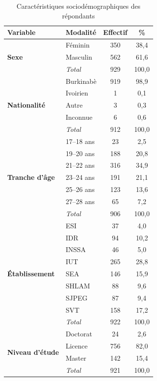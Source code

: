\documentclass[
12pt,          %
a4paper,       %
oneside,      %
openright      %
]{report}          %
\begin{document}
		\begin{table}[H]
			\centering
			\caption{Caractéristiques sociodémographiques des répondants}
			\label{tab:sociodem}
			\begin{tabular}{llcc}
				\toprule
				\textbf{Variable} & \textbf{Modalité} & \textbf{Effectif} & \textbf{\%} \\
				\midrule
				
				\multirow{3}{*}{\textbf{Sexe}}
				& Féminin        & 350 & 38,4 \\
				& Masculin       & 562 & 61,6 \\
				\cmidrule(l){2-4}
				& \textit{Total} & 929 & 100,0 \\
				\midrule
				
				\multirow{5}{*}{\textbf{Nationalité}}
				& Burkinabè      & 919 & 98,9 \\
				& Ivoirien       &   1 &  0,1 \\
				& Autre          &   3 &  0,3 \\
				& Inconnue       &   6 &  0,6 \\
				\cmidrule(l){2-4}
				& \textit{Total} & 912 & 100,0 \\
				\midrule
				
				\multirow{7}{*}{\textbf{Tranche d'âge}}
				& 17--18 ans     &  23 &  2,5 \\
				& 19--20 ans     & 188 & 20,8 \\
				& 21--22 ans     & 316 & 34,9 \\
				& 23--24 ans     & 191 & 21,1 \\
				& 25--26 ans     & 123 & 13,6 \\
				& 27--28 ans     &  65 &  7,2 \\
				\cmidrule(l){2-4}
				& \textit{Total} & 906 & 100,0 \\
				\midrule
				
				\multirow{9}{*}{\textbf{Établissement}}
				& ESI            &  37 &  4,0 \\
				& IDR            &  94 & 10,2 \\
				& INSSA          &  46 &  5,0 \\
				& IUT            & 265 & 28,8 \\
				& SEA            & 146 & 15,9 \\
				& SHLAM          &  88 &  9,6 \\
				& SJPEG          &  87 &  9,4 \\
				& SVT            & 158 & 17,2 \\
				\cmidrule(l){2-4}
				& \textit{Total} & 922 & 100,0 \\
				\midrule
				
				\multirow{4}{*}{\textbf{Niveau d'étude}}
				& Doctorat       &  24 &  2,6 \\
				& Licence        & 756 & 82,0 \\
				& Master         & 142 & 15,4 \\
				\cmidrule(l){2-4}
				& \textit{Total} & 921 & 100,0 \\
				
				\bottomrule
			\end{tabular}
		\end{table}
\end{document}
